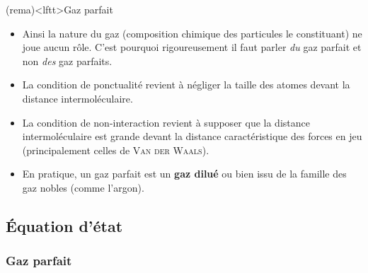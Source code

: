 \documentclass[../../main/main.tex]{subfiles}
\begin{document}
\begin{tcb}(rema)<lftt>{Gaz parfait}
	\begin{itemize}
		\item Ainsi la nature du gaz (composition chimique des particules le
		      constituant) ne joue aucun rôle. C'est pourquoi rigoureusement il faut
		      parler \textit{du} gaz parfait et non \textit{des} gaz parfaits.

		\item La condition de ponctualité revient à négliger la taille des atomes
		      devant la distance intermoléculaire.

		\item La condition de non-interaction revient à supposer que la distance
		      intermoléculaire est grande devant la distance caractéristique des
		      forces en jeu (principalement celles de \textsc{Van der Waals}).

		\item En pratique, un gaz parfait est un \textbf{gaz dilué} ou bien issu de la
		      famille des gaz nobles (comme l'argon).

	\end{itemize}
\end{tcb}
\vspace{-15pt}

\subsection{Équation d'état}
\subsubsection{Gaz parfait}
\end{document}

